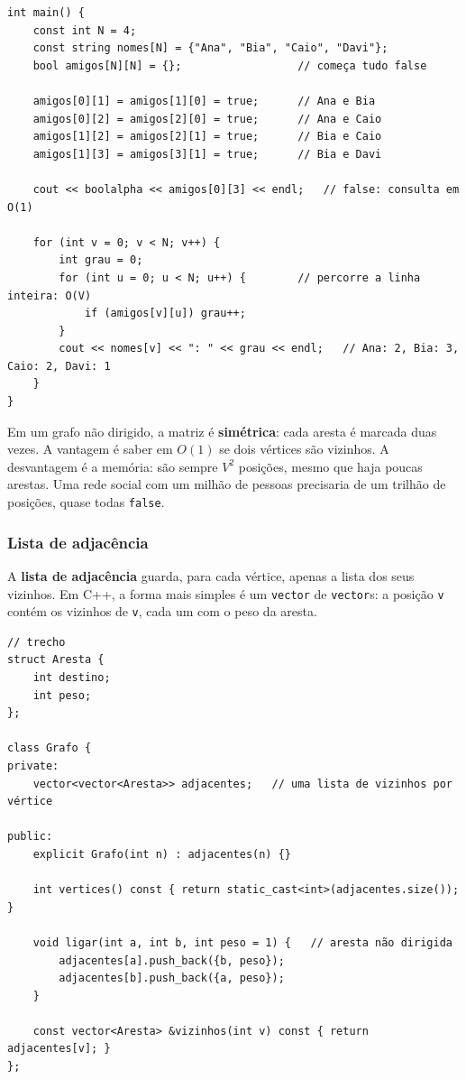 \begin{codigo}
\begin{Verbatim}[breaklines=true, breaksymbolleft={}, fontsize=\footnotesize]
int main() {
    const int N = 4;
    const string nomes[N] = {"Ana", "Bia", "Caio", "Davi"};
    bool amigos[N][N] = {};                  // começa tudo false

    amigos[0][1] = amigos[1][0] = true;      // Ana e Bia
    amigos[0][2] = amigos[2][0] = true;      // Ana e Caio
    amigos[1][2] = amigos[2][1] = true;      // Bia e Caio
    amigos[1][3] = amigos[3][1] = true;      // Bia e Davi

    cout << boolalpha << amigos[0][3] << endl;   // false: consulta em O(1)

    for (int v = 0; v < N; v++) {
        int grau = 0;
        for (int u = 0; u < N; u++) {        // percorre a linha inteira: O(V)
            if (amigos[v][u]) grau++;
        }
        cout << nomes[v] << ": " << grau << endl;   // Ana: 2, Bia: 3, Caio: 2, Davi: 1
    }
}
\end{Verbatim}
\end{codigo}

Em um grafo não dirigido, a matriz é \textbf{simétrica}: cada aresta é marcada duas vezes. A vantagem é saber em $O(1)$ se dois vértices são vizinhos. A desvantagem é a memória: são sempre $V^2$ posições, mesmo que haja poucas arestas. Uma rede social com um milhão de pessoas precisaria de um trilhão de posições, quase todas \texttt{false}.

\subsubsection{Lista de adjacência}

A \textbf{lista de adjacência} guarda, para cada vértice, apenas a lista dos seus vizinhos. Em C++, a forma mais simples é um \texttt{vector} de \texttt{vector}s: a posição \texttt{v} contém os vizinhos de \texttt{v}, cada um com o peso da aresta.

\begin{codigo}
\begin{Verbatim}[breaklines=true, breaksymbolleft={}, fontsize=\footnotesize]
// trecho
struct Aresta {
    int destino;
    int peso;
};

class Grafo {
private:
    vector<vector<Aresta>> adjacentes;   // uma lista de vizinhos por vértice

public:
    explicit Grafo(int n) : adjacentes(n) {}

    int vertices() const { return static_cast<int>(adjacentes.size()); }

    void ligar(int a, int b, int peso = 1) {   // aresta não dirigida
        adjacentes[a].push_back({b, peso});
        adjacentes[b].push_back({a, peso});
    }

    const vector<Aresta> &vizinhos(int v) const { return adjacentes[v]; }
};
\end{Verbatim}
\end{codigo}

